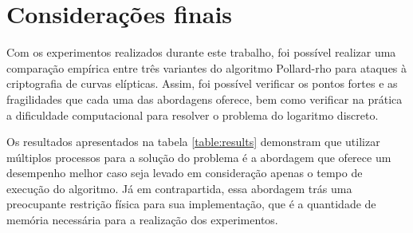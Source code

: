 \chapter{Considerações finais}
%
%

Com os experimentos realizados durante este trabalho, foi possível realizar uma comparação empírica entre três variantes do algoritmo Pollard-rho para ataques à criptografia de curvas elípticas. Assim, foi possível verificar os pontos fortes e as fragilidades que cada uma das abordagens oferece, bem como verificar na prática a dificuldade computacional para resolver o problema do logaritmo discreto.

Os resultados apresentados na tabela \ref{table:results} demonstram que utilizar múltiplos processos para a solução do problema é a abordagem que oferece um desempenho melhor caso seja levado em consideração apenas o tempo de execução do algoritmo. Já em contrapartida, essa abordagem trás uma preocupante restrição física para sua implementação, que é a quantidade de memória necessária para a realização dos experimentos.

